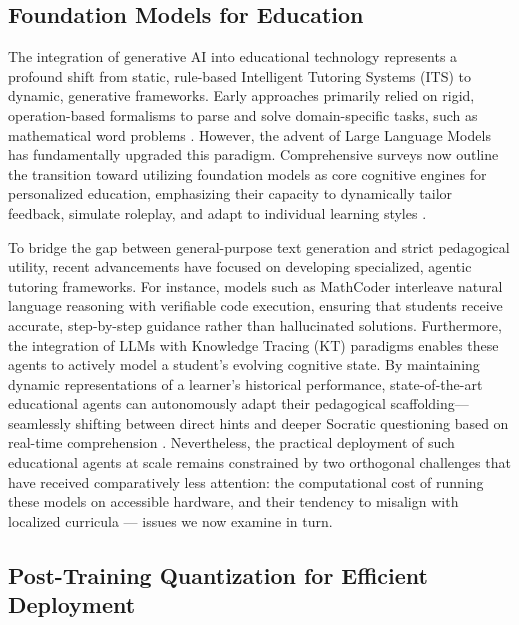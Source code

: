 \documentclass[10pt,conference]{IEEEtran}
\begin{document}
\subsection{Foundation Models for Education}
The integration of generative AI into educational technology represents a profound shift from static, rule-based Intelligent Tutoring Systems (ITS) to dynamic, generative frameworks. Early approaches primarily relied on rigid, operation-based formalisms to parse and solve domain-specific tasks, such as mathematical word problems \cite{amini2019mathqa}. However, the advent of Large Language Models has fundamentally upgraded this paradigm. Comprehensive surveys now outline the transition toward utilizing foundation models as core cognitive engines for personalized education, emphasizing their capacity to dynamically tailor feedback, simulate roleplay, and adapt to individual learning styles \cite{llmeducation2026}.

To bridge the gap between general-purpose text generation and strict pedagogical utility, recent advancements have focused on developing specialized, agentic tutoring frameworks. For instance, models such as MathCoder \cite{wang2024mathcoder} interleave natural language reasoning with verifiable code execution, ensuring that students receive accurate, step-by-step guidance rather than hallucinated solutions. Furthermore, the integration of LLMs with Knowledge Tracing (KT) paradigms enables these agents to actively model a student's evolving cognitive state. By maintaining dynamic representations of a learner's historical performance, state-of-the-art educational agents can autonomously adapt their pedagogical scaffolding—seamlessly shifting between direct hints and deeper Socratic questioning based on real-time comprehension \cite{macina2023mathdial}. Nevertheless, the practical deployment of such educational agents at scale remains constrained by two orthogonal challenges that have received comparatively less attention: the computational cost of running these models on accessible hardware, and their tendency to misalign with localized curricula — issues we now examine in turn.

\subsection{Post-Training Quantization for Efficient Deployment}
\label{subsec:quantization}
\end{document}

